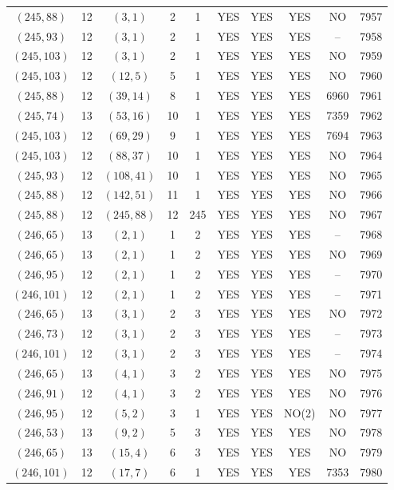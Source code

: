 \begin{longtable}{|c|c|c|c|c|c|c|c|c|c|}
$(245, 88)$ & 12 & $(3, 1)$ & 2 & 1 & YES & YES & YES & NO & 7957\\
$(245, 93)$ & 12 & $(3, 1)$ & 2 & 1 & YES & YES & YES & -- & 7958\\
$(245, 103)$ & 12 & $(3, 1)$ & 2 & 1 & YES & YES & YES & NO & 7959\\
$(245, 103)$ & 12 & $(12, 5)$ & 5 & 1 & YES & YES & YES & NO & 7960\\
$(245, 88)$ & 12 & $(39, 14)$ & 8 & 1 & YES & YES & YES & 6960 & 7961\\
$(245, 74)$ & 13 & $(53, 16)$ & 10 & 1 & YES & YES & YES & 7359 & 7962\\
$(245, 103)$ & 12 & $(69, 29)$ & 9 & 1 & YES & YES & YES & 7694 & 7963\\
$(245, 103)$ & 12 & $(88, 37)$ & 10 & 1 & YES & YES & YES & NO & 7964\\
$(245, 93)$ & 12 & $(108, 41)$ & 10 & 1 & YES & YES & YES & NO & 7965\\
$(245, 88)$ & 12 & $(142, 51)$ & 11 & 1 & YES & YES & YES & NO & 7966\\
$(245, 88)$ & 12 & $(245, 88)$ & 12 & 245 & YES & YES & YES & NO & 7967\\
$(246, 65)$ & 13 & $(2, 1)$ & 1 & 2 & YES & YES & YES & -- & 7968\\
$(246, 65)$ & 13 & $(2, 1)$ & 1 & 2 & YES & YES & YES & NO & 7969\\
$(246, 95)$ & 12 & $(2, 1)$ & 1 & 2 & YES & YES & YES & -- & 7970\\
$(246, 101)$ & 12 & $(2, 1)$ & 1 & 2 & YES & YES & YES & -- & 7971\\
$(246, 65)$ & 13 & $(3, 1)$ & 2 & 3 & YES & YES & YES & NO & 7972\\
$(246, 73)$ & 12 & $(3, 1)$ & 2 & 3 & YES & YES & YES & -- & 7973\\
$(246, 101)$ & 12 & $(3, 1)$ & 2 & 3 & YES & YES & YES & -- & 7974\\
$(246, 65)$ & 13 & $(4, 1)$ & 3 & 2 & YES & YES & YES & NO & 7975\\
$(246, 91)$ & 12 & $(4, 1)$ & 3 & 2 & YES & YES & YES & NO & 7976\\
$(246, 95)$ & 12 & $(5, 2)$ & 3 & 1 & YES & YES & NO(2) & NO & 7977\\
$(246, 53)$ & 13 & $(9, 2)$ & 5 & 3 & YES & YES & YES & NO & 7978\\
$(246, 65)$ & 13 & $(15, 4)$ & 6 & 3 & YES & YES & YES & NO & 7979\\
$(246, 101)$ & 12 & $(17, 7)$ & 6 & 1 & YES & YES & YES & 7353 & 7980\\

\end{longtable}
